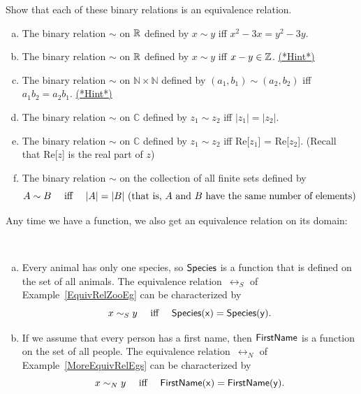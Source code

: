 \begin{exercise}\label{exercise:EquivalenceRelationsChap:EquivRelShowEx}
Show that each of these binary relations is an equivalence relation.
\begin{enumerate}[(a)]
\item \label{EquivRelShowEx-x2min3x}
The binary relation $\sim$ on $\mathbb{R}$ defined by $x \sim y$ iff $x^2 - 3x = y^2 - 3y$.
\item \label{EquivRelShowEx-xminyinZ}
The binary relation $\sim$ on $\mathbb{R}$ defined by $x \sim y$ iff $x - y \in \mathbb{Z}$.
\hyperref[sec:EquivalenceRelationsChap:hints]{(*Hint*)}
\item \label{EquivRelShowEx-ab=ab}
The binary relation $\sim$ on $\mathbb{N} \times \mathbb{N}$ defined by $(a_1,b_1) \sim (a_2,b_2)$ iff $a_1 b_2 = a_2 b_1$.
\hyperref[sec:EquivalenceRelationsChap:hints]{(*Hint*)}
\item \label{EquivRelComplex1}
The binary relation $\sim$ on $\mathbb{C}$ defined by $z_1 \sim z_2$ iff $|z_1|=|z_2|$.
\item \label{EquivRelComplex1}
The binary relation $\sim$ on $\mathbb{C}$  defined by $z_1 \sim z_2$ iff Re[$z_1$] = Re[$z_2$].  (Recall that Re[$z$] is the real part of $z$)
\item
The binary relation $\sim$ on the collection of all finite sets defined by
	$$ \text{$A \sim B$ \quad iff \quad $|A|=|B|$ (that is, $A$ and $B$ have the same number of elements)} $$
\end{enumerate}
\end{exercise}


Any time we have a function, we also get an equivalence relation on its domain:

\begin{eg} \ 
\begin{enumerate}[(a)]
\item Every animal has only one species, so $\sf{Species}$ is a function that is defined on the set of all animals. The equivalence relation~$\rel_S$ of Example~\ref{EquivRelZooEg} can be characterized by
	$$ \text{$x \sim_S y$ \quad iff \quad $\sf{Species}(x) = \sf{Species}(y)$} .$$
\item If we assume that every person has a first name, then $\sf{FirstName}$ is a function on the set of all people. The equivalence relation~$\rel_N$ of Example~\ref{MoreEquivRelEgs} can be characterized by
	$$ \text{$x \sim_N y$ \quad iff \quad $\sf{FirstName}(x) = \sf{FirstName}(y)$} .$$
\end{enumerate}
\end{eg}


